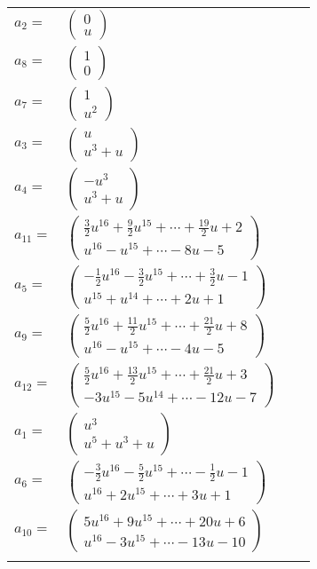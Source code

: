 \documentclass[1p]{elsarticle_modified}
\theoremstyle{definition}
\begin{document}
\begin{tabular}{m{7pt} m{180pt} m{7pt} m{180pt} }
\flushright $a_{2}=$&$\begin{pmatrix}0\\u\end{pmatrix}$ \\
\flushright $a_{8}=$&$\begin{pmatrix}1\\0\end{pmatrix}$ \\
\flushright $a_{7}=$&$\begin{pmatrix}1\\u^2\end{pmatrix}$ \\
\flushright $a_{3}=$&$\begin{pmatrix}u\\u^3+u\end{pmatrix}$ \\
\flushright $a_{4}=$&$\begin{pmatrix}- u^3\\u^3+u\end{pmatrix}$ \\
\flushright $a_{11}=$&$\begin{pmatrix}\frac{3}{2} u^{16}+\frac{9}{2} u^{15}+\cdots+\frac{19}{2} u+2\\u^{16}- u^{15}+\cdots-8 u-5\end{pmatrix}$ \\
\flushright $a_{5}=$&$\begin{pmatrix}-\frac{1}{2} u^{16}-\frac{3}{2} u^{15}+\cdots+\frac{3}{2} u-1\\u^{15}+u^{14}+\cdots+2 u+1\end{pmatrix}$ \\
\flushright $a_{9}=$&$\begin{pmatrix}\frac{5}{2} u^{16}+\frac{11}{2} u^{15}+\cdots+\frac{21}{2} u+8\\u^{16}- u^{15}+\cdots-4 u-5\end{pmatrix}$ \\
\flushright $a_{12}=$&$\begin{pmatrix}\frac{5}{2} u^{16}+\frac{13}{2} u^{15}+\cdots+\frac{21}{2} u+3\\-3 u^{15}-5 u^{14}+\cdots-12 u-7\end{pmatrix}$ \\
\flushright $a_{1}=$&$\begin{pmatrix}u^3\\u^5+u^3+u\end{pmatrix}$ \\
\flushright $a_{6}=$&$\begin{pmatrix}-\frac{3}{2} u^{16}-\frac{5}{2} u^{15}+\cdots-\frac{1}{2} u-1\\u^{16}+2 u^{15}+\cdots+3 u+1\end{pmatrix}$ \\
\flushright $a_{10}=$&$\begin{pmatrix}5 u^{16}+9 u^{15}+\cdots+20 u+6\\u^{16}-3 u^{15}+\cdots-13 u-10\end{pmatrix}$\\&\end{tabular}
\end{document}
